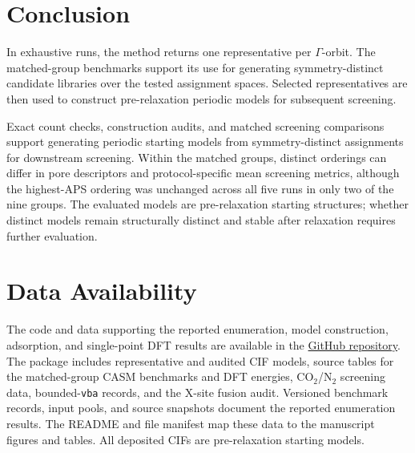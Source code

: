 \documentclass[a5paper, 10pt]{article}
\begin{document}
\section{Conclusion}
\label{sec:discussion}
In exhaustive runs, the method returns one representative per $\Gamma$-orbit. The matched-group benchmarks support its use for generating symmetry-distinct candidate libraries over the tested assignment spaces. Selected representatives are then used to construct pre-relaxation periodic models for subsequent screening.

Exact count checks, construction audits, and matched screening comparisons support generating periodic starting models from symmetry-distinct assignments for downstream screening. Within the matched groups, distinct orderings can differ in pore descriptors and protocol-specific mean screening metrics, although the highest-APS ordering was unchanged across all five runs in only two of the nine groups. The evaluated models are pre-relaxation starting structures; whether distinct models remain structurally distinct and stable after relaxation requires further evaluation.

\section*{Data Availability}
\label{sec:data}
The code and data supporting the reported enumeration, model construction, adsorption, and single-point DFT results are available in the \href{https://github.com/Buct454/mof-enumeration-reconstruction.git}{GitHub repository}. The package includes representative and audited CIF models, source tables for the matched-group CASM benchmarks and DFT energies, CO$_2$/N$_2$ screening data, bounded-\texttt{vba} records, and the X-site fusion audit. Versioned benchmark records, input pools, and source snapshots document the reported enumeration results. The README and file manifest map these data to the manuscript figures and tables. All deposited CIFs are pre-relaxation starting models.
\end{document}
